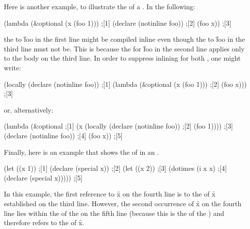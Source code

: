 Here is another example, to illustrate the  of a
.  In the following:

\code
 (lambda (&optional (x (foo 1))) ;[1]
   (declare (notinline foo))     ;[2]
   (foo x))                      ;[3]
\endcode

the  to \f{foo} in the first line might be 
compiled inline even though the  to \f{foo} in
the third line must not be.  This is because
the  
for \f{foo} in the second line applies only to the body on the
third line.  In order to suppress inlining for both , 
one might write:

\code
 (locally (declare (notinline foo)) ;[1]
   (lambda (&optional (x (foo 1)))  ;[2]
     (foo x)))                      ;[3]
\endcode

or, alternatively:

\code
 (lambda (&optional                               ;[1]
            (x (locally (declare (notinline foo)) ;[2]
                 (foo 1))))                       ;[3]
   (declare (notinline foo))                      ;[4]
   (foo x))                                       ;[5]
\endcode


Finally, here is an example that shows the  of
 in an .

\code
 (let ((x  1))                     ;[1]
   (declare (special x))           ;[2]
     (let ((x 2))                  ;[3]
       (dotimes (i x x)            ;[4]
         (declare (special x)))))  ;[5]
\endcode

In this example, the first reference to \f{x} on the fourth line is to
the  of \f{x} established on the third line.
However, the second occurrence of \f{x} on the fourth line lies within
the  of the  on the fifth line
(because this is the  of the )
and therefore refers to the  of \f{x}.

\endsubsubsection%

\endSubsection%
